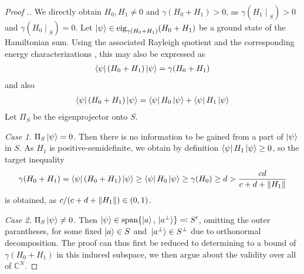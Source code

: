 \documentclass[10pt]{amsart}
\theoremstyle{definition}
\theoremstyle{remark}
\newcommand{\evalat}[2]{\left.{#1}\middle|\right._{#2}}
\begin{document}
    \begin{proof}[Proof {\cite[p. 74]{Childs_2014}}.]
        We directly obtain \(H_0, H_1 \neq 0\) and \(\gamma(H_0+H_1) > 0\), as \(\gamma(\evalat{H_1}{S}) > 0\) and \(\gamma(\evalat{H_0}{S}) = 0\). Let \(\ket{\psi} \in \text{eig}_{\gamma(H_0+H_1)}(H_0+H_1)\) be a ground state of the Hamiltonian sum. Using the associated Rayleigh quotient and the corresponding energy characterizations \cite[pp. 234-235]{Horn}, this may also be expressed as
        \begin{align}
            \bra{\psi}(H_0+H_1)\ket{\psi} = \gamma(H_0+H_1)
        \end{align}
        and also
        \begin{align}
            \bra{\psi}(H_0+H_1)\ket{\psi} = \bra{\psi}H_0\ket{\psi}+\bra{\psi}H_1\ket{\psi}
        \end{align}
        Let \(\Pi_S\) be the eigenprojector onto \(S\).

        \phantom{}

        \emph{Case 1.} \(\Pi_S\ket{\psi} = 0\). Then there is no information to be gained from a part of \(\ket{\psi}\) in \(S\). As \(H_1\) is positive-semidefinite, we obtain by definition \(\bra{\psi}H_1\ket{\psi} \geq 0\), so the target inequality
        \begin{align}
            \gamma(H_0+H_1) = \bra{\psi}(H_0+H_1)\ket{\psi} \geq \bra{\psi}H_0\ket{\psi} \geq \gamma(H_0) \geq d > \frac{cd}{c+d+\norm{H_1}}
        \end{align}
        is obtained, as \(c/(c+d+\norm{H_1}) \in (0, 1)\).

        \phantom{}

        \emph{Case 2.} \(\Pi_S\ket{\psi} \neq 0\). Then \(\ket{\psi} \in \text{span}\{\ket{a}, \ket*{a^\perp}\} \eqqcolon S'\), omitting the outer parantheses, for some fixed \(\ket{a} \in S\) and \(\ket*{a^\perp} \in S^\perp\) due to orthonormal decomposition. The proof can thus first be reduced to determining to a bound of \(\gamma(H_0+H_1)\) in this induced subspace, we then argue about the validity over all of \(\mathbb{C}^N\).


\end{proof}
\end{document}
